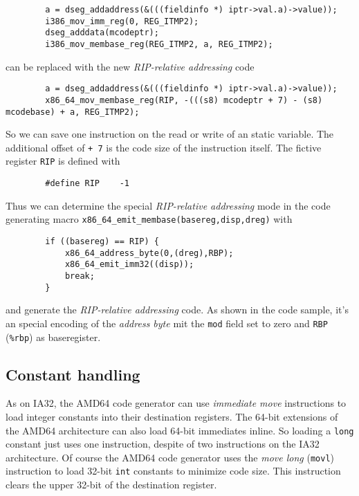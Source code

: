 \begin{verbatim}
        a = dseg_addaddress(&(((fieldinfo *) iptr->val.a)->value));
        i386_mov_imm_reg(0, REG_ITMP2);
        dseg_adddata(mcodeptr);
        i386_mov_membase_reg(REG_ITMP2, a, REG_ITMP2);
\end{verbatim}

can be replaced with the new \textit{RIP-relative addressing} code

\begin{verbatim}
        a = dseg_addaddress(&(((fieldinfo *) iptr->val.a)->value));
        x86_64_mov_membase_reg(RIP, -(((s8) mcodeptr + 7) - (s8) mcodebase) + a, REG_ITMP2);
\end{verbatim}

So we can save one instruction on the read or write of an static
variable. The additional offset of \texttt{+ 7} is the code size of
the instruction itself. The fictive register \texttt{RIP} is defined
with

\begin{verbatim}
        #define RIP    -1
\end{verbatim}

Thus we can determine the special \textit{RIP-relative addressing}
mode in the code generating macro
\texttt{x86\_64\_emit\_membase(basereg,disp,dreg)} with

\begin{verbatim}
        if ((basereg) == RIP) {
            x86_64_address_byte(0,(dreg),RBP);
            x86_64_emit_imm32((disp));
            break;
        }
\end{verbatim}

and generate the \textit{RIP-relative addressing} code. As shown in
the code sample, it's an special encoding of the \textit{address byte}
mit the \texttt{mod} field set to zero and \texttt{RBP}
(\texttt{\%rbp}) as baseregister.


\subsection{Constant handling}

As on IA32, the AMD64 code generator can use \textit{immediate move}
instructions to load integer constants into their destination
registers. The 64-bit extensions of the AMD64 architecture can also
load 64-bit immediates inline. So loading a \texttt{long} constant
just uses one instruction, despite of two instructions on the IA32
architecture. Of course the AMD64 code generator uses the \textit{move
long} (\texttt{movl}) instruction to load 32-bit \texttt{int} constants
to minimize code size. This instruction clears the upper 32-bit of the
destination register.

